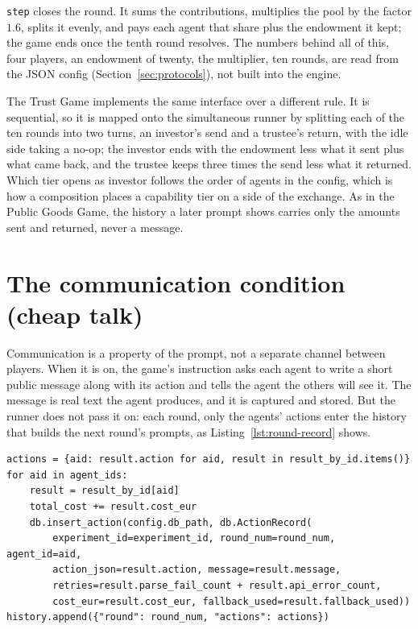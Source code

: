 \texttt{step} closes the round. It sums the contributions, multiplies the pool by the
factor \(1.6\), splits it evenly, and pays each agent that share plus the endowment it
kept; the game ends once the tenth round resolves. The numbers behind all of this, four
players, an endowment of twenty, the multiplier, ten rounds, are read from the JSON
config (Section~\ref{sec:protocols}), not built into the engine.

The Trust Game implements the same interface over a different rule. It is sequential, so
it is mapped onto the simultaneous runner by splitting each of the ten rounds into two
turns, an investor's send and a trustee's return, with the idle side taking a no-op; the
investor ends with the endowment less what it sent plus what came back, and the trustee
keeps three times the send less what it returned. Which tier opens as investor follows
the order of agents in the config, which is how a composition places a capability tier on
a side of the exchange. As in the Public Goods Game, the history a later prompt shows
carries only the amounts sent and returned, never a message.

\section{The communication condition (cheap talk)}
\label{sec:communication}

Communication is a property of the prompt, not a separate channel between players.
When it is on, the game's instruction asks each agent to write a short public
message along with its action and tells the agent the others will see it. The
message is real text the agent produces, and it is captured and stored. But the
runner does not pass it on: each round, only the agents' actions enter the history
that builds the next round's prompts, as Listing~\ref{lst:round-record} shows.

\begin{lstlisting}[caption={Recording a round (\texttt{runner/tournament.py}): each message is written to the database alongside the action, but the \texttt{history} that renders the next prompt holds only actions.}, label={lst:round-record}]
actions = {aid: result.action for aid, result in result_by_id.items()}
for aid in agent_ids:
    result = result_by_id[aid]
    total_cost += result.cost_eur
    db.insert_action(config.db_path, db.ActionRecord(
        experiment_id=experiment_id, round_num=round_num, agent_id=aid,
        action_json=result.action, message=result.message,
        retries=result.parse_fail_count + result.api_error_count,
        cost_eur=result.cost_eur, fallback_used=result.fallback_used))
history.append({"round": round_num, "actions": actions})
\end{lstlisting}

